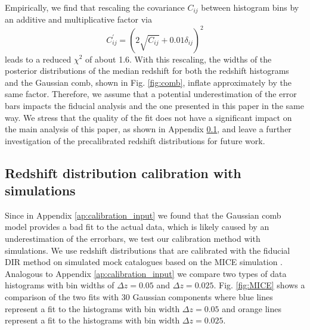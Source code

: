 \documentclass{aa}
\newcommand{\eq}[1]{\begin{equation}  #1 \end{equation}}
\begin{document}
\begin{appendix}
Empirically, we find that rescaling the covariance $C_{ij}$ between histogram bins by an additive and multiplicative factor via
\eq{
C^\prime_{ij} = \left(2\sqrt{C_{ij}}+0.01\delta_{ij}\right)^2
}
leads to a reduced $\chi^2$ of about 1.6. With this rescaling, the widths of the posterior distributions of the median redshift for both the redshift histograms and the Gaussian comb, shown in Fig. \ref{fig:comb}, inflate approximately by the same factor. Therefore, we assume that a potential underestimation of the error bars impacts the fiducial analysis and the one presented in this paper in the same way. We stress that the quality of the fit does not have a significant impact on the main analysis of this paper, as shown in Appendix \ref{sec:MICE}, and leave a further investigation of the precalibrated redshift distributions for future work.
\subsection{Redshift distribution calibration with simulations}
\label{sec:MICE}
Since in Appendix \ref{ap:calibration_input} we found that the Gaussian comb model provides a bad fit to the actual data, which is likely caused by an underestimation of the errorbars, we test our calibration method with simulations. We use redshift distributions that are calibrated with the fiducial DIR method on simulated mock catalogues \citep{vdBusch20} based on the MICE simulation \citep{Mice1, Mice2, Mice3, carretero, hoffmann}. Analogous to Appendix \ref{ap:calibration_input} we compare two types of data histograms with bin widths of $\Delta z = 0.05$ and $\Delta z = 0.025$. Fig. \ref{fig:MICE} shows a comparison of the two fits with 30 Gaussian components where blue lines represent a fit to the histograms with bin width $\Delta z = 0.05$ and orange lines represent a fit to the histograms with bin width $\Delta z = 0.025$. 


\end{appendix}
\end{document}
